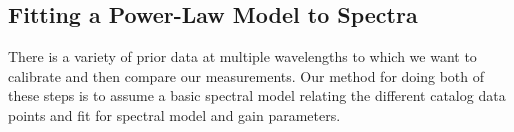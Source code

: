 \documentclass[preprint]{aastex}
\begin{document}



\subsection{Fitting a Power-Law Model to Spectra}


There is a variety of prior data at multiple wavelengths to which we want to calibrate
and then compare our measurements.  Our method for doing both of these steps
is to assume a basic spectral model relating the different catalog data points and
fit for spectral model and gain parameters. 
\end{document}
